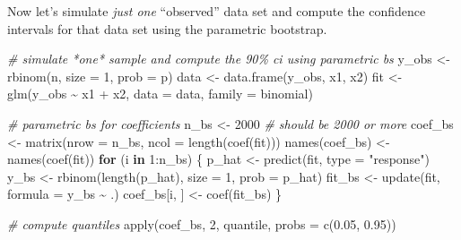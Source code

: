 \documentclass[
]{book}
\newenvironment{Shaded}{\begin{snugshade}}{\end{snugshade}}
\newcommand{\AttributeTok}[1]{\textcolor[rgb]{0.77,0.63,0.00}{#1}}
\newcommand{\CommentTok}[1]{\textcolor[rgb]{0.56,0.35,0.01}{\textit{#1}}}
\newcommand{\ControlFlowTok}[1]{\textcolor[rgb]{0.13,0.29,0.53}{\textbf{#1}}}
\newcommand{\DecValTok}[1]{\textcolor[rgb]{0.00,0.00,0.81}{#1}}
\newcommand{\FloatTok}[1]{\textcolor[rgb]{0.00,0.00,0.81}{#1}}
\newcommand{\FunctionTok}[1]{\textcolor[rgb]{0.00,0.00,0.00}{#1}}
\newcommand{\NormalTok}[1]{#1}
\newcommand{\OtherTok}[1]{\textcolor[rgb]{0.56,0.35,0.01}{#1}}
\newcommand{\SpecialCharTok}[1]{\textcolor[rgb]{0.00,0.00,0.00}{#1}}
\newcommand{\StringTok}[1]{\textcolor[rgb]{0.31,0.60,0.02}{#1}}
\begin{document}
Now let's simulate \emph{just one} ``observed'' data set and compute the
confidence intervals for that data set using the parametric bootstrap.

\begin{Shaded}
\begin{Highlighting}[]
\CommentTok{\# simulate *one* sample and compute the 90\% ci using parametric bs}
\NormalTok{y\_obs }\OtherTok{\textless{}{-}} \FunctionTok{rbinom}\NormalTok{(n, }\AttributeTok{size =} \DecValTok{1}\NormalTok{, }\AttributeTok{prob =}\NormalTok{ p)}
\NormalTok{data }\OtherTok{\textless{}{-}} \FunctionTok{data.frame}\NormalTok{(y\_obs, x1, x2)}
\NormalTok{fit }\OtherTok{\textless{}{-}} \FunctionTok{glm}\NormalTok{(y\_obs }\SpecialCharTok{\textasciitilde{}}\NormalTok{ x1 }\SpecialCharTok{+}\NormalTok{ x2, }\AttributeTok{data =}\NormalTok{ data, }\AttributeTok{family =}\NormalTok{ binomial)}

\CommentTok{\# parametric bs for coefficients}
\NormalTok{n\_bs }\OtherTok{\textless{}{-}} \DecValTok{2000}  \CommentTok{\# should be 2000 or more}
\NormalTok{coef\_bs }\OtherTok{\textless{}{-}} \FunctionTok{matrix}\NormalTok{(}\AttributeTok{nrow =}\NormalTok{ n\_bs, }\AttributeTok{ncol =} \FunctionTok{length}\NormalTok{(}\FunctionTok{coef}\NormalTok{(fit)))}
\FunctionTok{names}\NormalTok{(coef\_bs) }\OtherTok{\textless{}{-}} \FunctionTok{names}\NormalTok{(}\FunctionTok{coef}\NormalTok{(fit))}
\ControlFlowTok{for}\NormalTok{ (i }\ControlFlowTok{in} \DecValTok{1}\SpecialCharTok{:}\NormalTok{n\_bs) \{}
\NormalTok{  p\_hat }\OtherTok{\textless{}{-}} \FunctionTok{predict}\NormalTok{(fit, }\AttributeTok{type =} \StringTok{"response"}\NormalTok{)}
\NormalTok{  y\_bs }\OtherTok{\textless{}{-}} \FunctionTok{rbinom}\NormalTok{(}\FunctionTok{length}\NormalTok{(p\_hat), }\AttributeTok{size =} \DecValTok{1}\NormalTok{, }\AttributeTok{prob =}\NormalTok{ p\_hat)}
\NormalTok{  fit\_bs }\OtherTok{\textless{}{-}} \FunctionTok{update}\NormalTok{(fit, }\AttributeTok{formula =}\NormalTok{ y\_bs }\SpecialCharTok{\textasciitilde{}}\NormalTok{ .)}
\NormalTok{  coef\_bs[i, ] }\OtherTok{\textless{}{-}} \FunctionTok{coef}\NormalTok{(fit\_bs)}
\NormalTok{\}}

\CommentTok{\# compute quantiles}
\FunctionTok{apply}\NormalTok{(coef\_bs, }\DecValTok{2}\NormalTok{, quantile, }\AttributeTok{probs =} \FunctionTok{c}\NormalTok{(}\FloatTok{0.05}\NormalTok{, }\FloatTok{0.95}\NormalTok{))}
\end{Highlighting}
\end{Shaded}
\end{document}
